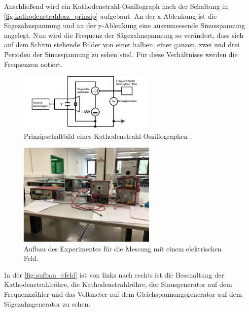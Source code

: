     \noindent Anschließend wird ein Kathodenstrahl-Oszillograph nach der Schaltung in \autoref{fig:kathodenstrahlosz_prinzip} aufgebaut. 
    An der x-Ablenkung ist die Sägezahnspannung und an der y-Ablenkung eine auszumessende Sinusspannung angelegt. Nun wird die Frequenz der
    Sägezahnspannung so verändert, dass sich auf dem Schirm stehende Bilder von einer halben, einer ganzen, zwei und drei Perioden der Sinusspannung
    zu sehen sind. Für diese Verhältnisse werden die Frequenzen notiert.

    \begin{figure}[H]
        \centering
        \includegraphics[width=0.6\textwidth]{bilder/prinzipschaltbild_kathodenstrahl.png}
        \caption{Prinzipschaltbild eines Kathodenstrahl-Oszillographen \cite{anleitung501}.}
        \label{fig:kathodenstrahlosz_prinzip}
    \end{figure}

    \begin{figure}[H]
        \centering
        \includegraphics[width=0.6\textwidth]{bilder/foto_elektrisch.jpeg}
        \caption{Aufbau des Experimentes für die Messung mit einem elektrischen Feld.}
        \label{fig:aufbau_efeld}
    \end{figure} 

    \noindent In der \autoref{fig:aufbau_efeld} ist von links nach rechts ist die Beschaltung der Kathodenstrahlröhre, die Kathodenstrahlröhre, der Sinusgenerator auf dem 
    Frequenzzähler und das Voltmeter auf dem Gleichspannungsgenerator auf dem Sägezahngenerator zu sehen.

